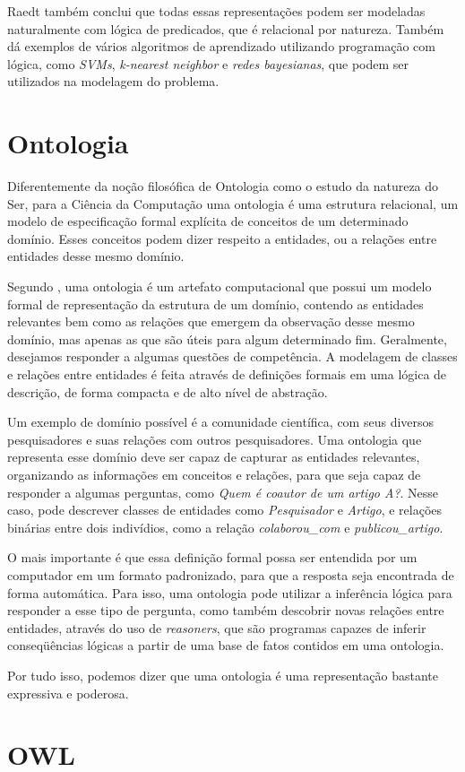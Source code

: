 Raedt também conclui que todas essas representações podem ser modeladas naturalmente com lógica de predicados, que é relacional por natureza. Também dá exemplos de vários algoritmos de aprendizado utilizando programação com lógica,
como \textit{SVMs}, \textit{k-nearest neighbor} e \textit{redes bayesianas}, que podem ser utilizados na modelagem do problema.

\section{Ontologia}
\label{sec:ontologia}

Diferentemente da noção filosófica de Ontologia como o estudo da natureza do Ser, para a Ciência da Computação uma ontologia é uma estrutura relacional, um modelo de especificação formal explícita de conceitos de um determinado domínio.
Esses conceitos podem dizer respeito a entidades, ou a relações entre entidades desse mesmo domínio.

Segundo \citet{Guarino2009}, uma ontologia é um artefato computacional que possui um modelo formal de representação da estrutura de um domínio, contendo as entidades relevantes bem como as relações que emergem da observação desse mesmo domínio, mas apenas as que são úteis para algum determinado fim. Geralmente, desejamos responder a algumas questões de competência. A modelagem de classes e relações entre entidades é feita através de definições formais em uma lógica de descrição, de forma compacta e de alto nível de abstração.

Um exemplo de domínio possível é a comunidade científica, com seus diversos pesquisadores e suas relações com outros pesquisadores. Uma ontologia que representa esse domínio deve ser capaz de capturar as entidades relevantes, organizando as informações em conceitos e relações, para que seja capaz de responder a algumas perguntas, como \textit{Quem é coautor de um artigo A?}. Nesse caso, pode descrever classes de entidades como \textit{Pesquisador} e \textit{Artigo}, e relações binárias entre dois indivídios, como a relação \textit{colaborou\_com} e \textit{publicou\_artigo}.

O mais importante é que essa definição formal possa ser entendida por um computador em um formato padronizado, para que a resposta seja encontrada de forma automática. Para isso, uma ontologia pode utilizar a inferência lógica para responder a esse tipo de pergunta, como também descobrir novas relações entre entidades, através do uso de \textit{reasoners}, que são programas capazes de inferir conseqüências lógicas a partir de uma base de fatos contidos em uma ontologia.

Por tudo isso, podemos dizer que uma ontologia é uma representação bastante expressiva e poderosa.

\section{OWL}
\label{sec:owl}

